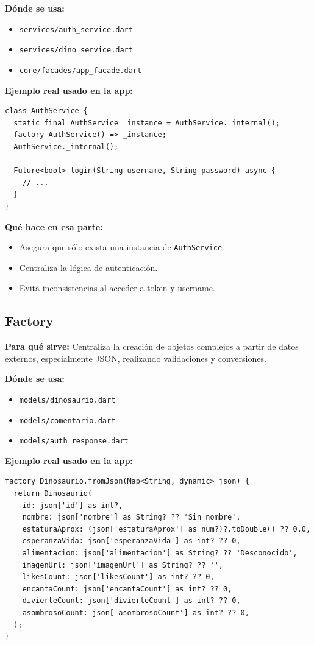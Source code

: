 \documentclass[12pt,a4paper]{article}
\begin{document}
\textbf{Dónde se usa:}
\begin{itemize}
    \item \texttt{services/auth_service.dart}
    \item \texttt{services/dino_service.dart}
    \item \texttt{core/facades/app_facade.dart}
\end{itemize}

\textbf{Ejemplo real usado en la app:}
\begin{lstlisting}
class AuthService {
  static final AuthService _instance = AuthService._internal();
  factory AuthService() => _instance;
  AuthService._internal();

  Future<bool> login(String username, String password) async {
    // ...
  }
}
\end{lstlisting}

\textbf{Qué hace en esa parte:}
\begin{itemize}
    \item Asegura que sólo exista una instancia de \texttt{AuthService}.
    \item Centraliza la lógica de autenticación.
    \item Evita inconsistencias al acceder a token y username.
\end{itemize}

\subsection{Factory}
\textbf{Para qué sirve:} Centraliza la creación de objetos complejos a partir de datos externos, especialmente JSON, realizando validaciones y conversiones.

\textbf{Dónde se usa:}
\begin{itemize}
    \item \texttt{models/dinosaurio.dart}
    \item \texttt{models/comentario.dart}
    \item \texttt{models/auth_response.dart}
\end{itemize}

\textbf{Ejemplo real usado en la app:}
\begin{lstlisting}
factory Dinosaurio.fromJson(Map<String, dynamic> json) {
  return Dinosaurio(
    id: json['id'] as int?,
    nombre: json['nombre'] as String? ?? 'Sin nombre',
    estaturaAprox: (json['estaturaAprox'] as num?)?.toDouble() ?? 0.0,
    esperanzaVida: json['esperanzaVida'] as int? ?? 0,
    alimentacion: json['alimentacion'] as String? ?? 'Desconocido',
    imagenUrl: json['imagenUrl'] as String? ?? '',
    likesCount: json['likesCount'] as int? ?? 0,
    encantaCount: json['encantaCount'] as int? ?? 0,
    divierteCount: json['divierteCount'] as int? ?? 0,
    asombrosoCount: json['asombrosoCount'] as int? ?? 0,
  );
}
\end{lstlisting}
\end{document}
